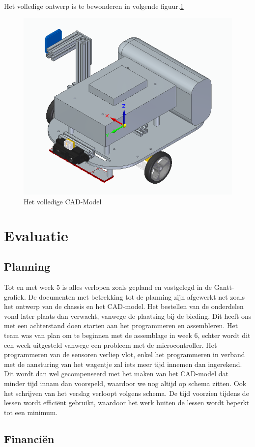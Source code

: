 \documentclass[a4paper,kulak]{kulakarticle}
\begin{document}
Het volledige ontwerp is te bewonderen in volgende figuur.\ref{fig:chassis}

\begin{figure}[h]
	\centering
	\includegraphics[width=.5\textwidth] {afbchassis}
	\caption{Het volledige CAD-Model}
	\label{fig:chassis}
\end{figure}

\section{Evaluatie}

\subsection{Planning}
Tot en met week 5 is alles verlopen zoals gepland en vastgelegd in de Gantt-grafiek. De documenten met betrekking tot de planning zijn afgewerkt net zoals het ontwerp van de chassis en het CAD-model. Het bestellen van de onderdelen vond later plaats dan verwacht, vanwege de plaatsing bij de bieding. Dit heeft ons met een achterstand doen starten aan het programmeren en assembleren. Het team was van plan om te beginnen met de assemblage in week 6, echter wordt dit een week uitgesteld vanwege een probleem met de microcontroller. Het programmeren van de sensoren verliep vlot, enkel het programmeren in verband met de aansturing van het wagentje zal iets meer tijd innemen dan ingerekend. Dit wordt dan wel gecompenseerd met het maken van het CAD-model dat minder tijd innam dan voorspeld, waardoor we nog altijd op schema zitten. Ook het schrijven van het verslag verloopt volgens schema. De tijd voorzien tijdens de lessen wordt efficiënt gebruikt, waardoor het werk buiten de lessen wordt beperkt tot een minimum.


\subsection{Financiën}
\end{document}

